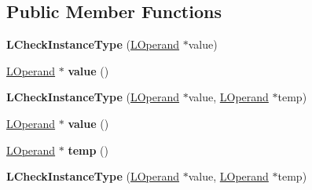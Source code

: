 \subsection*{Public Member Functions}
\begin{DoxyCompactItemize}
\item 
{\bfseries L\+Check\+Instance\+Type} (\hyperlink{classv8_1_1internal_1_1_l_operand}{L\+Operand} $\ast$value)\hypertarget{classv8_1_1internal_1_1_l_check_instance_type_aef52a756c4c37d9bd74680cb2fded84c}{}\label{classv8_1_1internal_1_1_l_check_instance_type_aef52a756c4c37d9bd74680cb2fded84c}

\item 
\hyperlink{classv8_1_1internal_1_1_l_operand}{L\+Operand} $\ast$ {\bfseries value} ()\hypertarget{classv8_1_1internal_1_1_l_check_instance_type_ac513993818cf84f02eff06d7cfcf9ed3}{}\label{classv8_1_1internal_1_1_l_check_instance_type_ac513993818cf84f02eff06d7cfcf9ed3}

\item 
{\bfseries L\+Check\+Instance\+Type} (\hyperlink{classv8_1_1internal_1_1_l_operand}{L\+Operand} $\ast$value, \hyperlink{classv8_1_1internal_1_1_l_operand}{L\+Operand} $\ast$temp)\hypertarget{classv8_1_1internal_1_1_l_check_instance_type_ae42de04466eb53b06eba9110a61829e2}{}\label{classv8_1_1internal_1_1_l_check_instance_type_ae42de04466eb53b06eba9110a61829e2}

\item 
\hyperlink{classv8_1_1internal_1_1_l_operand}{L\+Operand} $\ast$ {\bfseries value} ()\hypertarget{classv8_1_1internal_1_1_l_check_instance_type_ac513993818cf84f02eff06d7cfcf9ed3}{}\label{classv8_1_1internal_1_1_l_check_instance_type_ac513993818cf84f02eff06d7cfcf9ed3}

\item 
\hyperlink{classv8_1_1internal_1_1_l_operand}{L\+Operand} $\ast$ {\bfseries temp} ()\hypertarget{classv8_1_1internal_1_1_l_check_instance_type_aedf05b7543fbe7bdafe5b580bc211a5f}{}\label{classv8_1_1internal_1_1_l_check_instance_type_aedf05b7543fbe7bdafe5b580bc211a5f}

\item 
{\bfseries L\+Check\+Instance\+Type} (\hyperlink{classv8_1_1internal_1_1_l_operand}{L\+Operand} $\ast$value, \hyperlink{classv8_1_1internal_1_1_l_operand}{L\+Operand} $\ast$temp)\hypertarget{classv8_1_1internal_1_1_l_check_instance_type_ae42de04466eb53b06eba9110a61829e2}{}\label{classv8_1_1internal_1_1_l_check_instance_type_ae42de04466eb53b06eba9110a61829e2}


\end{DoxyCompactItemize}
